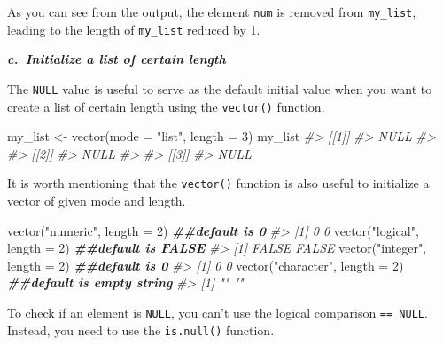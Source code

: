 \documentclass[
]{book}
\newenvironment{Shaded}{\begin{snugshade}}{\end{snugshade}}
\newcommand{\AttributeTok}[1]{\textcolor[rgb]{0.77,0.63,0.00}{#1}}
\newcommand{\CommentTok}[1]{\textcolor[rgb]{0.56,0.35,0.01}{\textit{#1}}}
\newcommand{\DecValTok}[1]{\textcolor[rgb]{0.00,0.00,0.81}{#1}}
\newcommand{\DocumentationTok}[1]{\textcolor[rgb]{0.56,0.35,0.01}{\textbf{\textit{#1}}}}
\newcommand{\FunctionTok}[1]{\textcolor[rgb]{0.00,0.00,0.00}{#1}}
\newcommand{\NormalTok}[1]{#1}
\newcommand{\OtherTok}[1]{\textcolor[rgb]{0.56,0.35,0.01}{#1}}
\newcommand{\StringTok}[1]{\textcolor[rgb]{0.31,0.60,0.02}{#1}}
\begin{document}
As you can see from the output, the element \texttt{num} is removed from \texttt{my\_list}, leading to the length of \texttt{my\_list} reduced by 1.

\textbf{\emph{c.~Initialize a list of certain length}}

The \texttt{NULL} value is useful to serve as the default initial value when you want to create a list of certain length using the \texttt{vector()} function.

\begin{Shaded}
\begin{Highlighting}[]
\NormalTok{my\_list }\OtherTok{\textless{}{-}} \FunctionTok{vector}\NormalTok{(}\AttributeTok{mode =} \StringTok{"list"}\NormalTok{, }\AttributeTok{length =} \DecValTok{3}\NormalTok{)}
\NormalTok{my\_list}
\CommentTok{\#\textgreater{} [[1]]}
\CommentTok{\#\textgreater{} NULL}
\CommentTok{\#\textgreater{} }
\CommentTok{\#\textgreater{} [[2]]}
\CommentTok{\#\textgreater{} NULL}
\CommentTok{\#\textgreater{} }
\CommentTok{\#\textgreater{} [[3]]}
\CommentTok{\#\textgreater{} NULL}
\end{Highlighting}
\end{Shaded}

It is worth mentioning that the \texttt{vector()} function is also useful to initialize a vector of given mode and length.

\begin{Shaded}
\begin{Highlighting}[]
\FunctionTok{vector}\NormalTok{(}\StringTok{"numeric"}\NormalTok{, }\AttributeTok{length =} \DecValTok{2}\NormalTok{)      }\DocumentationTok{\#\#default is 0}
\CommentTok{\#\textgreater{} [1] 0 0}
\FunctionTok{vector}\NormalTok{(}\StringTok{"logical"}\NormalTok{, }\AttributeTok{length =} \DecValTok{2}\NormalTok{)      }\DocumentationTok{\#\#default is FALSE}
\CommentTok{\#\textgreater{} [1] FALSE FALSE}
\FunctionTok{vector}\NormalTok{(}\StringTok{"integer"}\NormalTok{, }\AttributeTok{length =} \DecValTok{2}\NormalTok{)      }\DocumentationTok{\#\#default is 0}
\CommentTok{\#\textgreater{} [1] 0 0}
\FunctionTok{vector}\NormalTok{(}\StringTok{"character"}\NormalTok{, }\AttributeTok{length =} \DecValTok{2}\NormalTok{)    }\DocumentationTok{\#\#default is empty string}
\CommentTok{\#\textgreater{} [1] "" ""}
\end{Highlighting}
\end{Shaded}

To check if an element is \texttt{NULL}, you can't use the logical comparison \texttt{==\ NULL}. Instead, you need to use the \texttt{is.null()} function.
\end{document}
